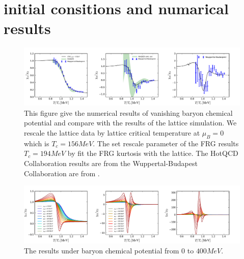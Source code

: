 \documentclass[%
reprint,
superscriptaddress,
showpacs,preprintnumbers,
 amsmath,amssymb,
 aps,
prd,
]{revtex4-1}
\begin{document}
\section{initial consitions and numarical results}
\label{sec:NR}
%
\begin{figure}[t]
\includegraphics[width=1\textwidth]{mub0}
\caption{This figure give the numerical results of vanishing baryon chemical potential and compare with the results of the lattice simulation. We rescale the lattice data by lattice critical temperature at $\mu_B=0$ which is $T_c=156MeV$. The set rescale parameter of the FRG results $T_c=194MeV$ by fit the FRG kurtosis with the lattice. The HotQCD Collaboration results are from \cite{Bazavov:2017dus,Bazavov:2017tot} the Wuppertal-Budapest Collaboration are from \cite{Borsanyi:2018grb}.}\label{fig:mub0}
\end{figure}
%
%
\begin{figure}[t]
\includegraphics[width=1\textwidth]{finmub}
\caption{The results under baryon chemical potential from $0$ to $400MeV$.}\label{fig:finmu}
\end{figure}
%
\end{document}
